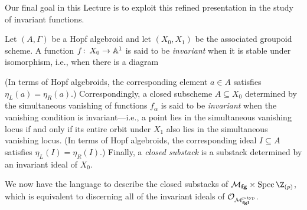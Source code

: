 Our final goal in this Lecture is to exploit this refined presentation in the study of invariant functions.
\begin{definition}\label{DefnClosedSubstack}
Let \((A, \Gamma)\) be a Hopf algebroid and let \((X_0, X_1)\) be the associated groupoid scheme.  A function \(f\colon\thinspace X_0 \to \mathbb A^1\) is said to be \textit{invariant} when it is stable under isomorphism, i.e., when there is a diagram
\begin{center}
\end{center}
(In terms of Hopf algebroids, the corresponding element \(a \in A\) satisfies \(\eta_L(a) = \eta_R(a)\).)  Correspondingly, a closed subscheme \(A \subseteq X_0\) determined by the simultaneous vanishing of functions \(f_\alpha\) is said to be \textit{invariant} when the vanishing condition is invariant---i.e., a point lies in the simultaneous vanishing locus if and only if its entire orbit under \(X_1\) also lies in the simultaneous vanishing locus.  (In terms of Hopf algebroids, the corresponding ideal \(I \subseteq A\) satisfies \(\eta_L(I) = \eta_R(I)\).)  Finally, a \textit{closed substack} is a substack determined by an invariant ideal of \(X_0\).
\end{definition}

We now have the language to describe the closed substacks of \(\moduli{fg} \times \Spec \Z_{(p)}\), which is equivalent to discerning all of the invariant ideals of \(\mathcal{O}_{\mathcal{M}_{\mathbf{fgl}}^{\mathit{p}\text{-}\mathrm{typ}}}\).

